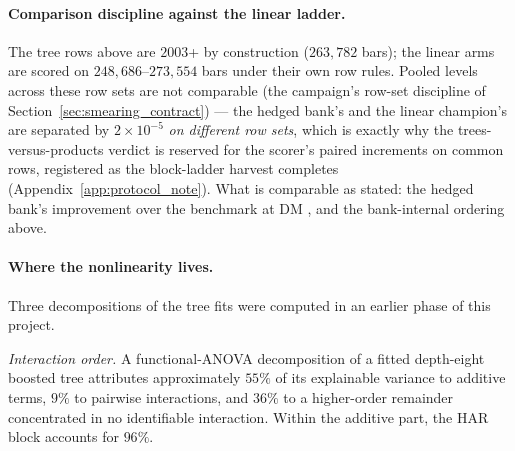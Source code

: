 \paragraph{Comparison discipline against the linear ladder.} The tree
rows above are $2003$+ by construction ($263{,}782$ bars); the linear
arms are scored
on $248{,}686$--$273{,}554$ bars under their own row rules. Pooled
levels across these row sets are not comparable (the campaign's row-set
discipline of Section~\ref{sec:smearing_contract}) --- the hedged
bank's \unifTreeHedgeQLIKE{} and the linear champion's
\unifBlkFourProdBbExogTrailSdQLIKE{} are separated by
$2 \times 10^{-5}$ \emph{on different row sets}, which is exactly why
the trees-versus-products verdict is reserved for the scorer's paired
increments on common rows, registered as the block-ladder harvest
completes (Appendix~\ref{app:protocol_note}). What is comparable as
stated: the hedged bank's \unifTreeHedgeDelta{} improvement over the
benchmark at
DM \unifTreeHedgeDM{}, and the bank-internal ordering above.


\paragraph{Where the nonlinearity lives.} Three decompositions of the tree
fits were computed in an earlier phase of this project.

\emph{Interaction order.} A functional-ANOVA decomposition of a fitted
depth-eight boosted tree attributes approximately $55\%$ of its explainable
variance to additive terms, $9\%$ to pairwise interactions, and $36\%$ to a
higher-order remainder concentrated in no identifiable interaction. Within
the additive part, the HAR block accounts for $96\%$.

